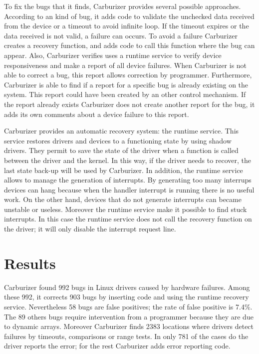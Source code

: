 \documentclass[11pt]{article}
\begin{document}
To fix the bugs that it finds, Carburizer provides several possible approaches. According to an  kind of bug, it adds code to validate the unchecked data received from the device or a timeout to avoid infinite loop. If the timeout expires or the data received is not valid, a failure can occurs. To avoid a failure Carburizer creates a recovery function, and adds code to call this function where the bug can appear.
Also, Carburizer verifies uses a runtime service to verify device responsiveness and make a report of all device failures. When Carburizer is not able to correct a bug, this report allows correction by programmer. Furthermore, Carburizer is able to find if a report for a specific bug is already existing on the system. This report could have been created by an other control mechanism. If the report already exists Carburizer does not create another report for the bug, it adds its own comments about a device failure to this report.

Carburizer provides an automatic recovery system: the runtime service. This service restores drivers and devices to a functioning state by using shadow drivers. They permit to save the state of the driver when a function is called between the driver and the kernel. In this way, if the driver needs to recover, the last state back-up will be used by Carburizer. In addition, the runtime service allows to manage the generation of interrupts. By generating too many interrups devices can hang because when the handler interrupt is running there is no useful work. On the other hand, devices that do not generate interrupts can became unstable or useless. Moreover the runtime service make it possible to find stuck interrupts. In this case the runtime service does not call the recovery function on the driver; it will only disable the interrupt request line.

\section{Results}
Carburizer found 992 bugs in Linux drivers caused by hardware failures. Among these 992, it corrects 903 bugs by inserting code and using the runtime recovery service. Nevertheless 58 bugs are false positives; the rate of false positive is 7.4\%. The 89 others bugs require intervention from a programmer because they are due to dynamic arrays. 
Moreover Carburizer finds 2383 locations where drivers detect failures by timeouts, comparisons or range tests. In only 781 of the cases do the driver reports the error; for the rest Carburizer adds error reporting code.
\end{document}

